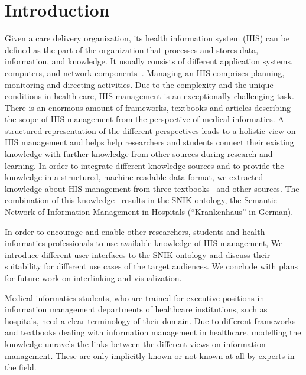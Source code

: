 \documentclass[sw]{iosart2x}
\renewcommand{\citep}{\cite}%
\begin{document}
\section{Introduction}
Given a care delivery organization, its health information system (HIS) can be defined as the part of the organization that processes and stores data, information, and knowledge.
It usually consists of different application systems, computers, and network components~\citep{bb}.
Managing an HIS comprises planning, monitoring and directing activities.
Due to the complexity and the unique conditions in health care, HIS management is an exceptionally challenging task.
There is an enormous amount of frameworks, textbooks and articles describing the scope of HIS management from the perspective of medical informatics.
A structured representation of the different perspectives leads to a holistic view on HIS management and helps help researchers and students connect their existing knowledge with further knowledge from other sources during research and learning.
In order to integrate different knowledge sources and to provide the knowledge in a structured, machine-readable data format, we extracted knowledge about HIS management from three textbooks~\citep{bb,ob,he} and other sources.
The combination of this knowledge~\citep{einsemantischesnetz,domaene,approachtosupport} results in the SNIK ontology, the Semantic Network of Information Management in Hospitals (\enquote{Krankenhaus} in German).

In order to encourage and enable other researchers, students and health informatics professionals to use available knowledge of HIS management, We introduce different user interfaces to the SNIK ontology and discuss their suitability for different use cases of the target audiences.
We conclude with plans for future work on interlinking and visualization.

Medical informatics students, who are trained for executive positions in information management departments of healthcare institutions, such as hospitals, need a clear terminology of their domain.
Due to different frameworks and textbooks dealing with information management in healthcare, modelling the knowledge unravels the links between the different views on information management.
These are only implicitly known or not known at all by experts in the field.
\end{document}
